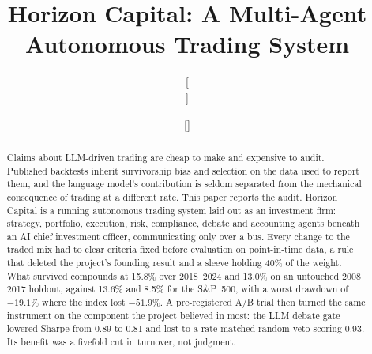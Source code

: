 \documentclass[conference]{IEEEtran}
\begin{document}
\title{Horizon Capital: A Multi-Agent Autonomous Trading System}

\author{
\and
{}
\and
{}
\and[{\\[0.4em]}]
\and[\hspace{4em}]
}

\maketitle

\begin{abstract}
Claims about LLM-driven trading are cheap to make and expensive to audit.
Published backtests inherit survivorship bias and selection on the data used to
report them, and the language model's contribution is seldom separated from the
mechanical consequence of trading at a different rate. This paper reports the
audit. Horizon Capital is a running autonomous trading system laid out as an
investment firm: strategy, portfolio, execution, risk, compliance, debate and
accounting agents beneath an AI chief investment officer, communicating only
over a bus. Every change to the traded mix had to clear criteria fixed
before evaluation on point-in-time data, a rule that deleted the project's
founding result and a sleeve holding 40\% of the weight. What survived
compounds at 15.8\% over 2018--2024 and 13.0\% on an untouched 2008--2017
holdout, against 13.6\% and 8.5\% for the S\&P~500, with a worst drawdown of
$-19.1\%$ where the index lost $-51.9\%$. A pre-registered A/B trial then
turned the same instrument on the component the project believed in most: the
LLM debate gate lowered Sharpe from 0.89 to 0.81 and lost to a rate-matched
random veto scoring 0.93. Its benefit was a fivefold cut in turnover, not
judgment.
\end{abstract}
\end{document}
